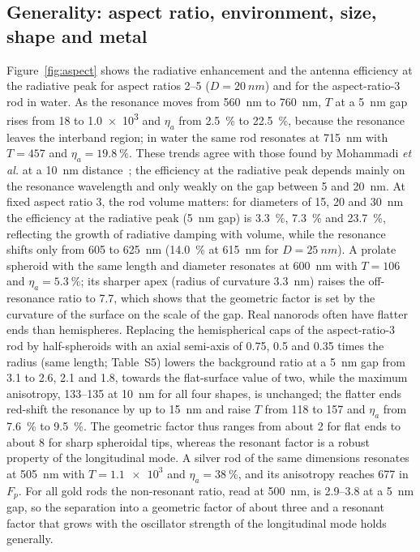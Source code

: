 \documentclass[11pt,a4paper]{article}
\newcommand{\Fp}{F_p}
\begin{document}
\subsection{Generality: aspect ratio, environment, size, shape and metal}
Figure~\ref{fig:aspect} shows the radiative enhancement and the antenna efficiency at the radiative peak for aspect
ratios 2--5 ($D=\SI{20}{nm}$) and for the aspect-ratio-3 rod in water. As the resonance moves from \SI{560}{nm}
to \SI{760}{nm}, $T$ at a \SI{5}{nm} gap rises from 18 to \num{1.0e3} and $\eta_a$ from \SI{2.5}{\percent} to
\SI{22.5}{\percent}, because the resonance leaves the interband region; in water the same rod resonates at
\SI{715}{nm} with $T=457$ and $\eta_a=\SI{19.8}{\percent}$. These trends agree with those found by Mohammadi
\emph{et al.} at a \SI{10}{nm} distance~\cite{mohammadi}; the efficiency at the radiative peak depends mainly on the
resonance wavelength and only weakly on the gap between 5 and \SI{20}{nm}. At fixed aspect ratio 3, the rod volume
matters: for diameters of 15, 20 and \SI{30}{nm} the efficiency at the radiative peak (\SI{5}{nm} gap) is
\SI{3.3}{\percent}, \SI{7.3}{\percent} and \SI{23.7}{\percent}, reflecting the growth of radiative damping with
volume, while the resonance shifts only from 605 to \SI{625}{nm} (\SI{14.0}{\percent} at \SI{615}{nm} for
$D=\SI{25}{nm}$). A prolate spheroid with the same length and diameter resonates at \SI{600}{nm} with $T=106$ and
$\eta_a=\SI{5.3}{\percent}$; its sharper apex (radius of curvature \SI{3.3}{nm}) raises the off-resonance ratio to
7.7, which shows that the geometric factor is set by the curvature of the surface on the scale of the gap. Real
nanorods often have flatter ends than hemispheres. Replacing the hemispherical caps of the aspect-ratio-3 rod by
half-spheroids with an axial semi-axis of 0.75, 0.5 and 0.35 times the radius (same length; Table~S5) lowers the
background ratio at a \SI{5}{nm} gap from 3.1 to 2.6, 2.1 and 1.8, towards the flat-surface value of two, while the
maximum anisotropy, 133--135 at \SI{10}{nm} for all four shapes, is unchanged; the flatter ends red-shift the
resonance by up to \SI{15}{nm} and raise $T$ from 118 to 157 and $\eta_a$ from \SI{7.6}{\percent} to
\SI{9.5}{\percent}. The geometric factor thus ranges from about 2 for flat ends to about 8 for sharp spheroidal tips,
whereas the resonant factor is a robust property of the longitudinal mode. A silver rod of the same
dimensions resonates at \SI{505}{nm} with $T=\num{1.1e3}$ and $\eta_a=\SI{38}{\percent}$, and its anisotropy reaches
677 in $\Fp$. For all gold rods the non-resonant ratio, read at \SI{500}{nm}, is 2.9--3.8 at a \SI{5}{nm} gap, so the
separation into a geometric factor of about three and a resonant factor that grows with the oscillator strength
of the longitudinal mode holds generally.
\end{document}
